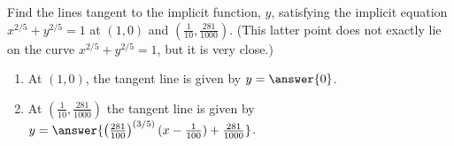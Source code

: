 \documentclass{ximera}
\author{Gregory Hartman \and Matthew Carr}
\begin{document}
\begin{exercise}




Find the lines tangent to the implicit function, $y$, satisfying the implicit equation $x^{2/5}+y^{2/5}=1$ at $(1,0)$ and $\left(\frac{1}{10},\frac{281}{1000}\right)$. (This latter point does not exactly lie on the curve $x^{2/5}+y^{2/5}=1$, but it is very close.)

\begin{enumerate}
\item At $(1,0)$, the tangent line is given by $y= \answer{0}$.
\item At $\left(\frac{1}{10},\frac{281}{1000}\right)$ the tangent line is given by $y=\answer{\left(\frac{281}{100}\right)^{(3/5)}(x-\frac{1}{100})+\frac{281}{1000}}$.
\end{enumerate}
\end{exercise}
\end{document}
